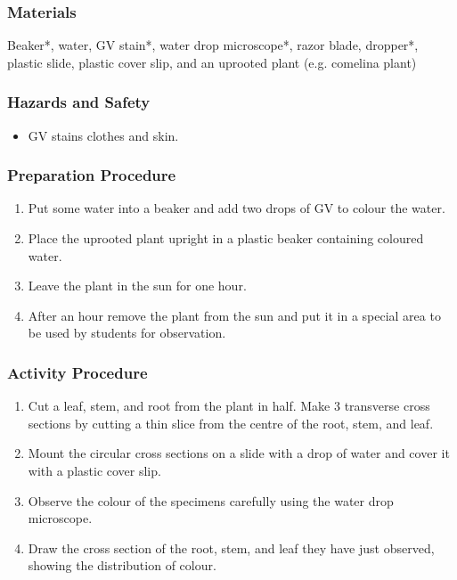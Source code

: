 \subsubsection*{Materials}
Beaker*, water, GV stain*, water drop microscope*, razor blade, dropper*, plastic slide, plastic cover slip, and an uprooted plant (e.g. comelina plant)

\subsubsection*{Hazards and Safety}
\begin{itemize}
\item{GV stains clothes and skin.}
\end{itemize}

\subsubsection*{Preparation Procedure}
\begin{enumerate}
\item{Put some water into a beaker and add two drops of GV to colour the water.}
\item{Place the uprooted plant upright in a plastic beaker containing coloured water.}
\item{Leave the plant in the sun for one hour.}
\item{After an hour remove the plant from the sun and put it in a special area to be used by students for observation.}
\end{enumerate}

\subsubsection*{Activity Procedure}
\begin{enumerate}
\item{Cut a leaf, stem, and root from the plant in half. Make 3 transverse cross sections by cutting a thin slice from the centre of the root, stem, and leaf.}
\item{Mount the circular cross sections on a slide with a drop of water and cover it with a plastic cover slip.}
\item{Observe the colour of the specimens carefully using the water drop microscope.}
\item{Draw the cross section of the root, stem, and leaf they have just observed, showing the distribution of colour.}
\end{enumerate}

